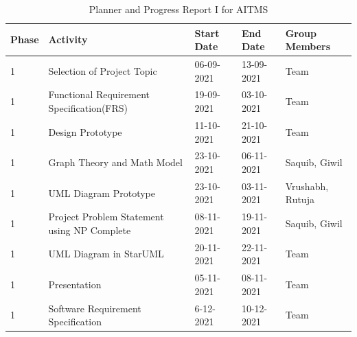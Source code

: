\documentclass[openany,12pt]{report}
\begin{document}
	\newpage
	\begin{table} [htb]
		\centering
		\begin{tabular}{| p{1.2 cm}| p{5 cm}| p{2.5 cm}| p{2.5 cm}| p{3 cm}| }\hline
			\textbf{Phase}	&\textbf{Activity}	&\textbf{Start Date}	&\textbf{End Date} &\textbf{Group Members}\\\hline\hline
			1 &Selection of Project Topic	&06-09-2021 	&13-09-2021 &Team \\\hline
			1 &Functional Requirement Specification(FRS) &19-09-2021 &03-10-2021 &Team\\\hline
			1 &Design Prototype &11-10-2021 &21-10-2021 &Team\\\hline
			1 &Graph Theory and Math Model &23-10-2021 &06-11-2021 & Saquib, Giwil\\\hline
			1 &UML Diagram Prototype &23-10-2021 &03-11-2021 &Vrushabh, \newline Rutuja \\\hline
			1 &Project Problem Statement using NP Complete &08-11-2021 &19-11-2021 &Saquib, Giwil\\\hline
			1 &UML Diagram in StarUML &20-11-2021 &22-11-2021 &Team \\\hline
			1 &Presentation &05-11-2021 &08-11-2021 &Team \\\hline
			1 &Software Requirement Specification &6-12-2021 &10-12-2021 &Team \\\hline
		\end{tabular}
		\caption{Planner and Progress Report I for AITMS}
		\label{tab:nnwork}
	\end{table}
\end{document}

